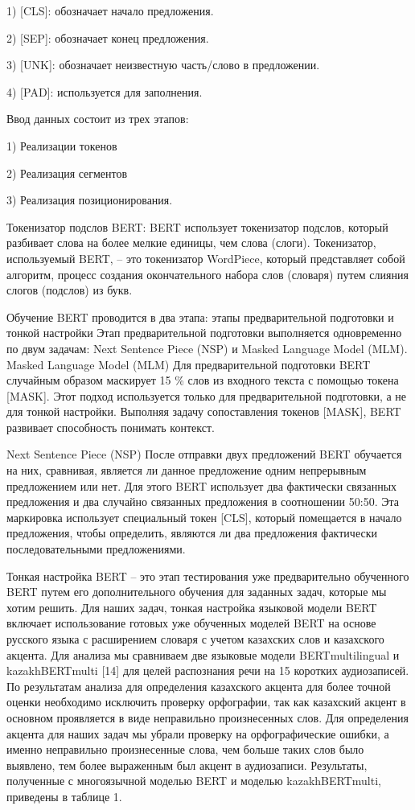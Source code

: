 1) {[}CLS{]}: обозначает начало предложения.

2) {[}SEP{]}: обозначает конец предложения.

3) {[}UNK{]}: обозначает неизвестную часть/слово в предложении.

4) {[}PAD{]}: используется для заполнения.

Ввод данных состоит из трех этапов:

1) Реализации токенов

2) Реализация сегментов

3) Реализация позиционирования.

Токенизатор подслов BERT: BERT использует токенизатор подслов, который
разбивает слова на более мелкие единицы, чем слова (слоги). Токенизатор,
используемый BERT, -- это токенизатор WordPiece, который представляет
собой алгоритм, процесс создания окончательного набора слов (словаря)
путем слияния слогов (подслов) из букв.

Обучение BERT проводится в два этапа: этапы предварительной подготовки и
тонкой настройки Этап предварительной подготовки выполняется
одновременно по двум задачам: Next Sentence Piece (NSP) и Masked
Language Model (MLM). Masked Language Model (MLM) Для предварительной
подготовки BERT случайным образом маскирует 15 \% слов из входного
текста с помощью токена {[}MASK{]}. Этот подход используется только для
предварительной подготовки, а не для тонкой настройки. Выполняя задачу
сопоставления токенов {[}MASK{]}, BERT развивает способность понимать
контекст.

Next Sentence Piece (NSP) После отправки двух предложений BERT обучается
на них, сравнивая, является ли данное предложение одним непрерывным
предложением или нет. Для этого BERT использует два фактически связанных
предложения и два случайно связанных предложения в соотношении 50:50.
Эта маркировка использует специальный токен {[}CLS{]}, который
помещается в начало предложения, чтобы определить, являются ли два
предложения фактически последовательными предложениями.

Тонкая настройка BERT -- это этап тестирования уже предварительно
обученного BERT путем его дополнительного обучения для заданных задач,
которые мы хотим решить. Для наших задач, тонкая настройка языковой
модели BERT включает использование готовых уже обученных моделей BERT на
основе русского языка с расширением словаря с учетом казахских слов и
казахского акцента. Для анализа мы сравниваем две языковые модели
BERTmultilingual и kazakhBERTmulti {[}14{]} для целей распознания речи
на 15 коротких аудиозаписей. По результатам анализа для определения
казахского акцента для более точной оценки необходимо исключить проверку
орфографии, так как казахский акцент в основном проявляется в виде
неправильно произнесенных слов. Для определения акцента для наших задач
мы убрали проверку на орфографические ошибки, а именно неправильно
произнесенные слова, чем больше таких слов было выявлено, тем более
выраженным был акцент в аудиозаписи. Результаты, полученные с
многоязычной моделью BERT и моделью kazakhBERTmulti, приведены в таблице
1.

